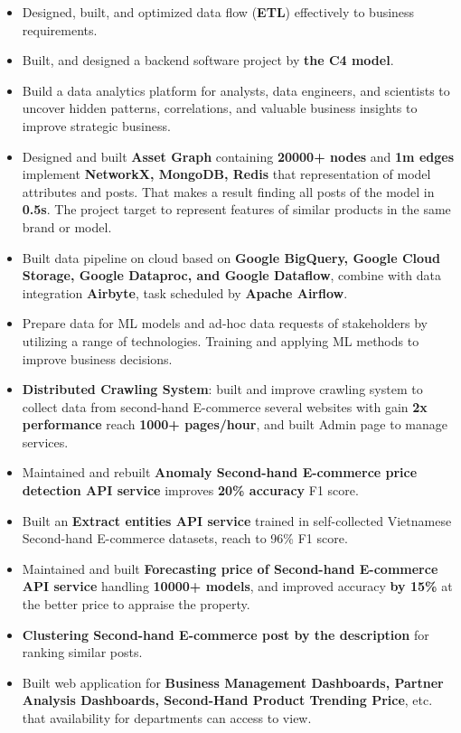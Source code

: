 \documentclass[10pt,a4paper,ragged2e,withhyper]{altacv}
\begin{document}
\begin{paracol}{2}
\begin{itemize}
    \item Designed, built, and optimized data flow (\textbf{ETL}) effectively to business requirements.
    \item Built, and designed a backend software project by \textbf{the C4 model}.
    \item  Build a data analytics platform for analysts, data engineers, and scientists to uncover hidden patterns, correlations, and valuable business insights to improve strategic business.
    \item  Designed and built \textbf{Asset Graph} containing \textbf{20000+ nodes} and \textbf{1m edges} implement \textbf{NetworkX, MongoDB, Redis} that representation of model attributes and posts. That makes a result finding all posts of the model in \textbf{0.5s}. The project target to represent features of similar products in the same brand or model.
    \item  Built data pipeline on cloud based on \textbf{Google BigQuery, Google Cloud Storage, Google Dataproc, and Google Dataflow}, combine with data integration \textbf{Airbyte}, task scheduled by \textbf{Apache Airflow}.
    \item  Prepare data for ML models and ad-hoc data requests of stakeholders by utilizing a range of technologies. Training and applying ML methods to improve business decisions.
    \item  \textbf{Distributed Crawling System}: built and improve crawling system to collect data from second-hand E-commerce several websites with gain \textbf{2x performance} reach \textbf{1000+ pages/hour}, and built Admin page to manage services.
    \item  Maintained and rebuilt \textbf{Anomaly Second-hand E-commerce price detection API service} improves \textbf{20\% accuracy} F1 score.
    \item  Built an \textbf{Extract entities API service} trained in self-collected Vietnamese Second-hand E-commerce datasets, reach to 96\% F1 score.
    \item  Maintained and built \textbf{Forecasting price of Second-hand E-commerce API service} handling \textbf{10000+ models}, and improved accuracy \textbf{by 15\% }at the better price to appraise the property.
    \item  \textbf{Clustering Second-hand E-commerce post by the description} for ranking similar posts.
    \item  Built web application for \textbf{Business Management Dashboards, Partner Analysis Dashboards, Second-Hand Product Trending Price}, etc. that availability for departments can access to view.
\end{itemize}


\end{paracol}
\end{document}
